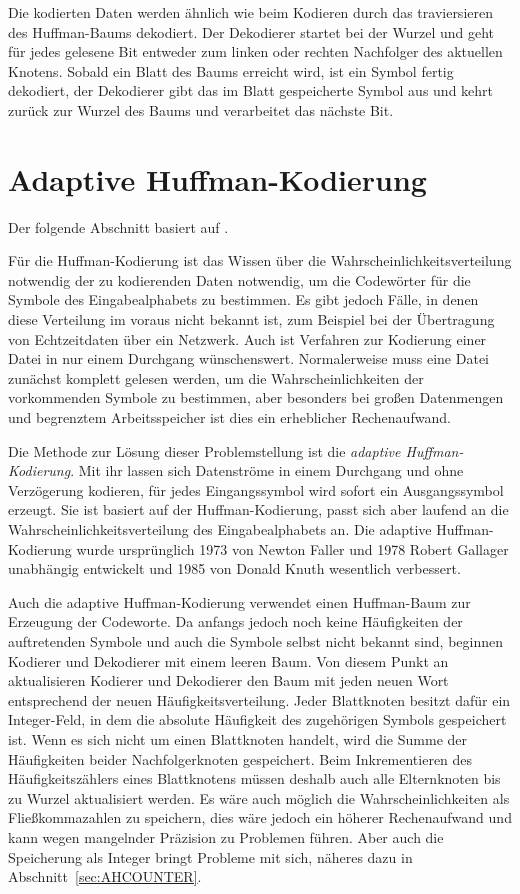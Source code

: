 \documentclass[twoside,11pt,a4paper]{article}
\theoremstyle{break}
\begin{document}
Die kodierten Daten werden ähnlich wie beim Kodieren durch das
traviersieren des Huffman-Baums dekodiert. Der Dekodierer startet bei
der Wurzel und geht für jedes gelesene Bit entweder zum linken oder
rechten Nachfolger des aktuellen Knotens. Sobald ein Blatt des Baums
erreicht wird, ist ein Symbol fertig dekodiert, der Dekodierer gibt
das im Blatt gespeicherte Symbol aus und kehrt zurück zur Wurzel des
Baums und verarbeitet das nächste Bit.

\section{Adaptive Huffman-Kodierung}
Der folgende Abschnitt basiert auf \cite{Salomon:2010}.

Für die Huffman-Kodierung ist das Wissen über die
Wahrscheinlichkeitsverteilung notwendig der zu kodierenden Daten
notwendig, um die Codewörter für die Symbole des Eingabealphabets zu
bestimmen. Es gibt jedoch Fälle, in denen diese Verteilung im voraus
nicht bekannt ist, zum Beispiel bei der Übertragung von Echtzeitdaten
über ein Netzwerk. Auch ist Verfahren zur Kodierung einer Datei in nur
einem Durchgang wünschenswert. Normalerweise muss eine Datei zunächst
komplett gelesen werden, um die Wahrscheinlichkeiten der vorkommenden
Symbole zu bestimmen, aber besonders bei großen Datenmengen und
begrenztem Arbeitsspeicher ist dies ein erheblicher Rechenaufwand.

Die Methode zur Lösung dieser Problemstellung ist die \emph{adaptive
  Huffman-Kodierung}. Mit ihr lassen sich Datenströme in einem
Durchgang und ohne Verzögerung kodieren, für jedes Eingangssymbol wird
sofort ein Ausgangssymbol erzeugt. Sie ist basiert auf der
Huffman-Kodierung, passt sich aber laufend an die
Wahrscheinlichkeitsverteilung des Eingabealphabets an. Die adaptive
Huffman-Kodierung wurde ursprünglich 1973 von Newton Faller und 1978
Robert Gallager unabhängig entwickelt und 1985 von Donald Knuth
wesentlich verbessert.

Auch die adaptive Huffman-Kodierung verwendet einen Huffman-Baum zur
Erzeugung der Codeworte. Da anfangs jedoch noch keine Häufigkeiten der
auftretenden Symbole und auch die Symbole selbst nicht bekannt sind,
beginnen Kodierer und Dekodierer mit einem leeren Baum. Von diesem
Punkt an aktualisieren Kodierer und Dekodierer den Baum mit jeden
neuen Wort entsprechend der neuen Häufigkeitsverteilung. Jeder
Blattknoten besitzt dafür ein Integer-Feld, in dem die absolute
Häufigkeit des zugehörigen Symbols gespeichert ist. Wenn es sich nicht
um einen Blattknoten handelt, wird die Summe der Häufigkeiten beider
Nachfolgerknoten gespeichert. Beim Inkrementieren des
Häufigkeitszählers eines Blattknotens müssen deshalb auch alle
Elternknoten bis zu Wurzel aktualisiert werden. Es wäre auch
möglich die Wahrscheinlichkeiten als Fließkommazahlen zu speichern,
dies wäre jedoch ein höherer Rechenaufwand und kann wegen mangelnder
Präzision zu Problemen führen. Aber auch die Speicherung als Integer bringt
Probleme mit sich, näheres dazu in Abschnitt~\ref{sec:AHCOUNTER}.
\end{document}
